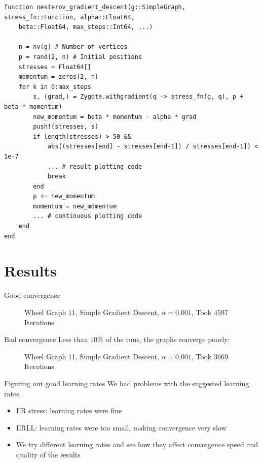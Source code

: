 \documentclass{beamer}
\begin{document}
\begin{frame}[fragile]
\begin{verbatim}
function nesterov_gradient_descent(g::SimpleGraph, stress_fn::Function, alpha::Float64,
    beta::Float64, max_steps::Int64, ...)

    n = nv(g) # Number of vertices
    p = rand(2, n) # Initial positions
    stresses = Float64[]
    momentum = zeros(2, n)
    for k in 0:max_steps
        s, (grad,) = Zygote.withgradient(q -> stress_fn(g, q), p + beta * momentum)
        new_momentum = beta * momentum - alpha * grad
        push!(stresses, s)
        if length(stresses) > 50 &&
            abs((stresses[end] - stresses[end-1]) / stresses[end-1]) < 1e-7
            ... # result plotting code
            break
        end
        p += new_momentum
        momentum = new_momentum
        ... # continuous plotting code
    end
end
\end{verbatim}
\end{frame}

\section{Results}

\begin{frame}{Good convergence}
\begin{figure}[H]
\centering

\caption{\label{wheel-graph-good} Wheel Graph 11, Simple Gradient Descent, $\alpha=0.001$, Took 4597 Iterations}
\end{figure}
\end{frame}

\begin{frame}{Bad convergence}
    Less than $10\%$ of the runs, the graphs converge poorly:
\begin{figure}[H]
\centering

\caption{\label{wheel-graph-bad} Wheel Graph 11, Simple Gradient Descent, $\alpha=0.001$, Took 3669 Iterations}
\end{figure}
\end{frame}

\begin{frame}{Figuring out good learning rates}
    We had problems with the suggested learning rates.
    \begin{itemize}
        \item FR stress: learning rates were fine
        \item ERLL: learning rates were too small, making convergence very slow
        \item We try different learning rates and see how they affect convergence speed and quality of the results
    \end{itemize}
\end{frame}
\end{document}
